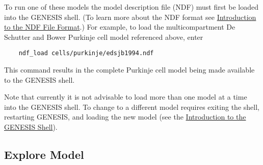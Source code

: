 \documentclass[12pt]{article}
\begin{document}
To run one of these models the model description file (NDF) must first be loaded into the GENESIS shell.  (To learn more about the NDF format see  \href{../ndf-file-format/ndf-file-format.tex}{Introduction to the NDF File Format}.) For example, to load the multicompartment De Schutter and Bower Purkinje cell model referenced above, enter
\begin{verbatim}
    ndf_load cells/purkinje/edsjb1994.ndf
\end{verbatim}
This command results in the complete Purkinje cell model being made available to the GENESIS shell.

Note that currently it is not advisable to load more than one model at a time into the GENESIS shell. To change to a different model requires exiting the shell, restarting GENESIS, and loading the new model (see the \href{../gshell/gshell.tex}{Introduction to the GENESIS Shell}).

\subsection*{Explore Model}
\end{document}
